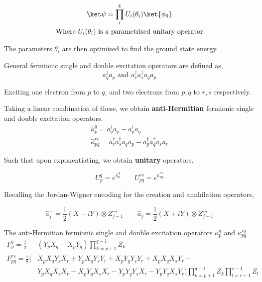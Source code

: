 \begin{equation*}
\begin{gathered}
    \ket\psi = \prod_i^k U_i(\theta_i) \ket{\phi_0} \\
    \text{Where $U_i(\theta_i)$ is a parametrised unitary operator}
\end{gathered}
\end{equation*}\smallskip

The parameters $\theta_i$ are then optimised to find the ground state energy.

General fermionic single and double excitation operators are defined as,
\begin{equation*}
    a_q^\dagger a_p \text{ and } a_r^\dagger a_s^\dagger a_q a_p
\end{equation*}

Exciting one electron from $p$ to $q$, and two electrons from $p, q$ to $r, s$ respectively.

Taking a linear combination of these, we obtain \textbf{anti-Hermitian} fermionic single and double excitation operators.
\begin{equation*}
\begin{gathered}
    \hat\kappa_p^q = a_q^\dagger a_p - a_p^\dagger a_q \\
    \hat\kappa_{pq}^{rs} =
    a_r^\dagger a_s^\dagger a_q a_p - a_p^\dagger a_q^\dagger a_s a_r
\end{gathered}
\end{equation*}\smallskip

Such that upon exponentiating, we obtain \textbf{unitary} operators.

\begin{equation*}
    U^q_p = e^{\hat\kappa_p^q} \qquad
    U_{pq}^{rs} = e^{\hat\kappa_{pq}^{rs}}
\end{equation*}

Recalling the Jordan-Wigner encoding for the creation and annhilation operators,

\begin{equation*}
    \hat a_j^+ = \frac{1}{2} (X - iY) \otimes Z^\rightarrow_{j-1} \qquad
    \hat a_j = \frac{1}{2} (X + iY) \otimes Z^\rightarrow_{j-1}
\end{equation*}

The anti-Hermitian fermionic single and double excitation operators $\kappa_p^q$ and $\kappa_{pq}^{rs}$
\begin{align*}
    F_p^q = \frac{i}{2} & (Y_p X_q - X_p Y_q) \prod_{k=p+1}^{q-1} Z_k \\
    F_{pq}^{rs} = \frac{i}{8} (
      & X_p X_q Y_s X_r +
        Y_p X_q Y_s Y_r +
        X_p Y_q Y_s Y_r +
        X_p X_q X_s Y_r - \\
      & Y_p X_q X_s X_r -
        X_p Y_q X_s X_r -
        Y_p Y_q Y_s X_r -
        Y_p Y_q X_s Y_r )
    \prod_{k=p+1}^{q-1} Z_k
    \prod_{l=r+1}^{s-1} Z_l
\end{align*}

